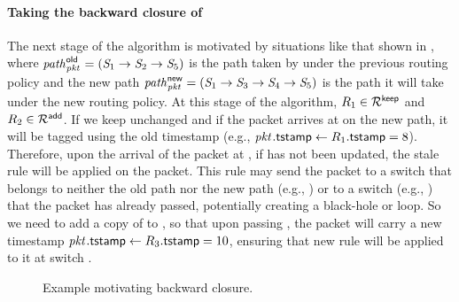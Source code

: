 \medskip

\hspace*{-\parindent}

\paragraph{Taking the backward closure of \addRules}



The next stage of the algorithm is motivated by situations like that
shown in , where $\oldPath{\pktID{}} =
(\switchID{1} \rightarrow \switchID{2} \rightarrow \switchID{5})$ is
the path taken by \pktID{} under the previous routing policy and the
new path $\newPath{\pktID{}} = (\switchID{1} \rightarrow
\switchID{3} \rightarrow \switchID{4} \rightarrow \switchID{5})$ is the
path it will take under the new routing policy.  At this stage of the
algorithm, $\ruleID{1} \in \keepRules$ and $\ruleID{2} \in
\addRules$. If we keep  unchanged and if the packet \pktID{}
arrives at  on the new path, it will be tagged using the
old timestamp (e.g., $\pktID{}{\tagTmpField} \gets
\ruleID{1}{\tagTmpField} = 8$). Therefore, upon the arrival of the
packet at , if  has not been updated, the
stale rule  will be applied on the packet.  This rule may
send the packet to a switch that belongs to neither the old path nor
the new path (e.g., ) or to a switch (e.g., )
that the packet has already passed, potentially creating a black-hole
or loop. So we need to add a copy  of  to
\addRules, so that upon passing , the packet will carry a
new timestamp $\pktID{}{\tagTmpField} \gets \ruleID{3}{\tagTmpField} =
10$, ensuring that new rule  will be applied to it at switch
.

\begin{figure}
\centering
\resizebox{0.75\linewidth}{!}{}
\caption{Example motivating backward closure.}
\label{fig:backward example}
\end{figure}




